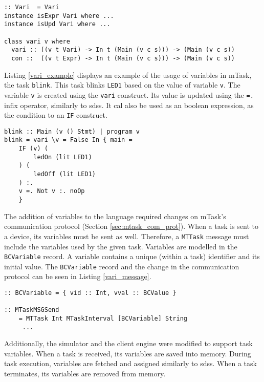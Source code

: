 \begin{lstlisting}[caption=The \texttt{vari} class,captionpos=b,label=vari_class]
:: Vari  = Vari
instance isExpr Vari where ...
instance isUpd Vari where ...

class vari v where
  vari :: ((v t Vari) -> In t (Main (v c s))) -> (Main (v c s)) 
  con ::  ((v t Expr) -> In t (Main (v c s))) -> (Main (v c s))
\end{lstlisting}

Listing \ref{vari_example} displays an example of the usage of variables in \gls{mTask}, the task \texttt{blink}. This task blinks \texttt{LED1} based on the value of variable \texttt{v}. The variable \texttt{v} is created using the \texttt{vari} construct. Its value is updated using the \texttt{=.} infix operator, similarly to \acp{sds}. It cal also be used as an boolean expression, as the condition to an \texttt{IF} construct.

\begin{lstlisting}[caption=Example of the usage of variables in mTask,captionpos=b,label=vari_example]
blink :: Main (v () Stmt) | program v
blink = vari \v = False In { main =
	IF (v) (
		ledOn (lit LED1)
	) (
		ledOff (lit LED1)
	) :.
	v =. Not v :. noOp
	}
\end{lstlisting}

The addition of variables to the language required changes on \gls{mTask}'s communication protocol (Section \ref{sec:mtask_com_prot}). When a task is sent to a device, its variables must be sent as well. Therefore, a \texttt{MTTask} message must include the variables used by the given task. Variables are modelled in the \texttt{BCVariable} record. A variable contains a unique (within a task) identifier and its initial value. The \texttt{BCVariable} record and the change in the communication protocol can be seen in Listing \ref{vari_message}.

\begin{lstlisting}[caption=Changes in mTask's communication protocol to accommodate task variables,captionpos=b,label=vari_message]
:: BCVariable = { vid :: Int, vval :: BCValue }

:: MTaskMSGSend
	= MTTask Int MTaskInterval [BCVariable] String
	 ...
\end{lstlisting}

Additionally, the simulator and the client engine were modified to support task variables. When a task is received, its variables are saved into memory. During task execution, variables are fetched and assigned similarly to \acp{sds}. When a task terminates, its variables are removed from memory.

